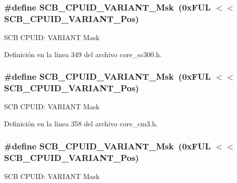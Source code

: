 \subsubsection[{\texorpdfstring{S\+C\+B\+\_\+\+C\+P\+U\+I\+D\+\_\+\+V\+A\+R\+I\+A\+N\+T\+\_\+\+Msk}{SCB_CPUID_VARIANT_Msk}}]{\setlength{\rightskip}{0pt plus 5cm}\#define S\+C\+B\+\_\+\+C\+P\+U\+I\+D\+\_\+\+V\+A\+R\+I\+A\+N\+T\+\_\+\+Msk~(0x\+F\+U\+L $<$$<$ S\+C\+B\+\_\+\+C\+P\+U\+I\+D\+\_\+\+V\+A\+R\+I\+A\+N\+T\+\_\+\+Pos)}\hypertarget{group___c_m_s_i_s___s_c_b_gad358dfbd04300afc1824329d128b99e8}{}\label{group___c_m_s_i_s___s_c_b_gad358dfbd04300afc1824329d128b99e8}
S\+CB C\+P\+U\+ID\+: V\+A\+R\+I\+A\+NT Mask 

Definición en la línea 349 del archivo core\+\_\+sc300.\+h.

\subsubsection[{\texorpdfstring{S\+C\+B\+\_\+\+C\+P\+U\+I\+D\+\_\+\+V\+A\+R\+I\+A\+N\+T\+\_\+\+Msk}{SCB_CPUID_VARIANT_Msk}}]{\setlength{\rightskip}{0pt plus 5cm}\#define S\+C\+B\+\_\+\+C\+P\+U\+I\+D\+\_\+\+V\+A\+R\+I\+A\+N\+T\+\_\+\+Msk~(0x\+F\+U\+L $<$$<$ S\+C\+B\+\_\+\+C\+P\+U\+I\+D\+\_\+\+V\+A\+R\+I\+A\+N\+T\+\_\+\+Pos)}\hypertarget{group___c_m_s_i_s___s_c_b_gad358dfbd04300afc1824329d128b99e8}{}\label{group___c_m_s_i_s___s_c_b_gad358dfbd04300afc1824329d128b99e8}
S\+CB C\+P\+U\+ID\+: V\+A\+R\+I\+A\+NT Mask 

Definición en la línea 358 del archivo core\+\_\+cm3.\+h.

\subsubsection[{\texorpdfstring{S\+C\+B\+\_\+\+C\+P\+U\+I\+D\+\_\+\+V\+A\+R\+I\+A\+N\+T\+\_\+\+Msk}{SCB_CPUID_VARIANT_Msk}}]{\setlength{\rightskip}{0pt plus 5cm}\#define S\+C\+B\+\_\+\+C\+P\+U\+I\+D\+\_\+\+V\+A\+R\+I\+A\+N\+T\+\_\+\+Msk~(0x\+F\+U\+L $<$$<$ S\+C\+B\+\_\+\+C\+P\+U\+I\+D\+\_\+\+V\+A\+R\+I\+A\+N\+T\+\_\+\+Pos)}\hypertarget{group___c_m_s_i_s___s_c_b_gad358dfbd04300afc1824329d128b99e8}{}\label{group___c_m_s_i_s___s_c_b_gad358dfbd04300afc1824329d128b99e8}
S\+CB C\+P\+U\+ID\+: V\+A\+R\+I\+A\+NT Mask 

